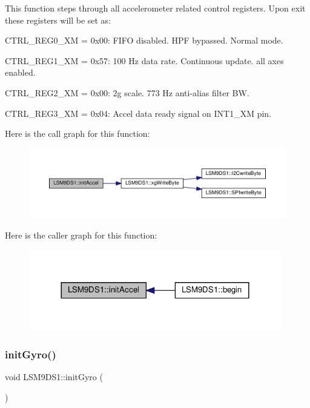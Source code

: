 This function steps through all accelerometer related control registers. Upon exit these registers will be set as\+:
\begin{DoxyItemize}
\item C\+T\+R\+L\+\_\+\+R\+E\+G0\+\_\+\+XM = 0x00\+: F\+I\+FO disabled. H\+PF bypassed. Normal mode.
\item C\+T\+R\+L\+\_\+\+R\+E\+G1\+\_\+\+XM = 0x57\+: 100 Hz data rate. Continuous update. all axes enabled.
\item C\+T\+R\+L\+\_\+\+R\+E\+G2\+\_\+\+XM = 0x00\+: 2g scale. 773 Hz anti-\/alias filter BW.
\item C\+T\+R\+L\+\_\+\+R\+E\+G3\+\_\+\+XM = 0x04\+: Accel data ready signal on I\+N\+T1\+\_\+\+XM pin. 
\end{DoxyItemize}Here is the call graph for this function\+:
\nopagebreak
\begin{figure}[H]
\begin{center}
\leavevmode
\includegraphics[width=350pt]{classLSM9DS1_a143ff5abf4f7ba8e1c42325859106f84_cgraph}
\end{center}
\end{figure}
Here is the caller graph for this function\+:
\nopagebreak
\begin{figure}[H]
\begin{center}
\leavevmode
\includegraphics[width=312pt]{classLSM9DS1_a143ff5abf4f7ba8e1c42325859106f84_icgraph}
\end{center}
\end{figure}
\mbox{\label{classLSM9DS1_a66a7b02acb28964ffc9362f25988e270}} 
\subsubsection{\texorpdfstring{init\+Gyro()}{initGyro()}}
{\footnotesize\ttfamily void L\+S\+M9\+D\+S1\+::init\+Gyro (\begin{DoxyParamCaption}{ }\end{DoxyParamCaption})\hspace{0.3cm}{\ttfamily [protected]}}



